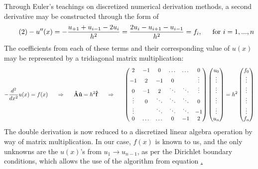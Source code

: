 \documentclass[11pt,a4paper,notitlepage]{article}
\begin{document}
Through Euler's teachings on discretized numerical derivation methods, a second derivative may be constructed through the form of
\begin{align}\label{eq:2}\tag{2}
-u''(x) = - \frac{u_{+1} + u_{i-1} - 2u_i}{h^2} = \frac{2u_i - u_{i+1} - u_{i-1}}{h^2} = f_i , \indent \text{for}\ i = 1,...,n
\end{align}
The coefficients from each of these terms and their corresponding value of $u(x)$ may be represented by a tridiagonal matrix multiplication:
\begin{align*}
-\frac{d^2}{dx^2}u(x) = f(x) \indent \Rightarrow \indent \mathbf{\hat{A}}\mathbf{\hat{u}} = h^2\mathbf{\hat{f}} \indent \Rightarrow \indent \left(\begin{matrix}
  2     & -1     & 0      & \dots  & \dots  & 0      \\
 -1     &  2     & -1     & 0      &        & \vdots \\
  0     & -1     &  2     & \ddots & \ddots & \vdots \\
 \vdots & 0      & \ddots & \ddots & \ddots & 0      \\
 \vdots &        & \ddots & \ddots & \ddots & -1     \\
  0     & \dots  & \dots  & 0      & -1     & 2      \\
\end{matrix}\right) \left(\begin{matrix}
u_0 \\
\vdots\\
\vdots\\
\vdots\\
\vdots\\
u_n \\
\end{matrix}\right) = h^2\left(\begin{matrix}
f_0 \\
\vdots\\
\vdots\\
\vdots\\
\vdots\\
f_n \\
\end{matrix}\right)
\end{align*}
The double derivation is now reduced to a discretized linear algebra  operation by way of matrix multiplication. In our case, $f(x)$ is known to us, and the only unknowns are the $u(x)$'s from $u_1 \rightarrow u_{n-1}$, as per the Dirichlet boundary conditions, which allows the use of the algorithm from equation \href{eq:2}.
\end{document}
